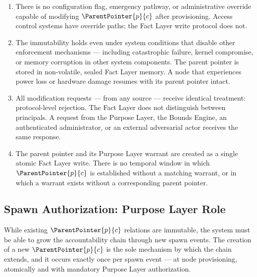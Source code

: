 \begin{enumerate}
    \item[(E1) \textbf{No override path.}] There is no configuration flag, emergency pathway, or administrative override capable of modifying $\ParentPointer{p}{c}$ after provisioning. Access control systems have override paths; the Fact Layer write protocol does not.

    \item[(E2) \textbf{Failure-state resilience.}] The immutability holds even under system conditions that disable other enforcement mechanisms --- including catastrophic failure, kernel compromise, or memory corruption in other system components. The parent pointer is stored in non-volatile, sealed Fact Layer memory. A node that experiences power loss or hardware damage resumes with its parent pointer intact.

    \item[(E3) \textbf{Source-equivalence of enforcement.}] All modification requests --- from any source --- receive identical treatment: protocol-level rejection. The Fact Layer does not distinguish between principals. A request from the Purpose Layer, the Bounds Engine, an authenticated administrator, or an external adversarial actor receives the same response.

    \item[(E4) \textbf{Atomic warrant-pointer creation.}] The parent pointer and its Purpose Layer warrant are created as a single atomic Fact Layer write. There is no temporal window in which $\ParentPointer{p}{c}$ is established without a matching warrant, or in which a warrant exists without a corresponding parent pointer.
\end{enumerate}

\subsection{Spawn Authorization: Purpose Layer Role}
\label{sec:purpose-layer-authorization}

While existing $\ParentPointer{p}{c}$ relations are immutable, the system must be able to grow the accountability chain through new spawn events. The creation of a new $\ParentPointer{p}{c}$ is the sole mechanism by which the chain extends, and it occurs exactly once per spawn event --- at node provisioning, atomically and with mandatory Purpose Layer authorization.

